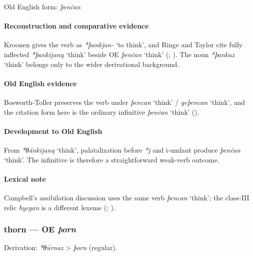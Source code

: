\documentclass[
  british,
  a4paper,
]{article}
\providecommand{\Recon}[1]{\emph{*#1}}
\begin{document}
Old English form: \emph{þenċan}

\paragraph{Reconstruction and comparative
evidence}\label{reconstruction-and-comparative-evidence-64}

Kroonen gives the verb as \emph{*þankjan-} `to think', and Ringe and
Taylor cite fully inflected \Recon{þankijaną} `think' beside OE
\emph{þenċan} `think' (;
). The noun
\Recon{þankaz} `think' belongs only to the wider derivational
background.

\paragraph{Old English evidence}\label{old-english-evidence-66}

Bosworth-Toller preserves the verb under \emph{þencan} `think' /
\emph{geþencan} `think', and the citation form here is the ordinary
infinitive \emph{þenċan} `think'
().

\paragraph{Development to Old
English}\label{development-to-old-english-65}

From \Recon{θánkijaną} `think', palatalization before \emph{*j} and
i-umlaut produce \emph{þenċan} `think'. The infinitive is therefore a
straightforward weak-verb outcome.

\paragraph{Lexical note}\label{lexical-note}

Campbell's assibilation discussion uses the same verb \emph{þencan}
`think'; the class-III relic \emph{hycgan} is a different lexeme
(;
).

\subsubsection{\texorpdfstring{thorn --- OE
\emph{þorn}}{thorn --- OE þorn}}\label{thorn-oe-uxfeorn}

Derivation: \emph{*θúrnaz} \textgreater{} \emph{þorn} (regular).
\end{document}
